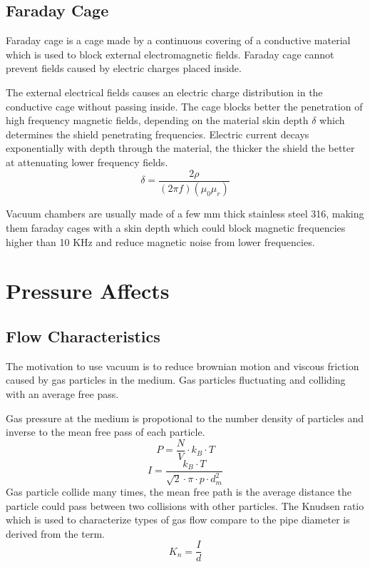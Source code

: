 \documentclass[\main/master.tex]{subfiles}
\begin{document}
\subsection{Faraday Cage}
Faraday cage is a cage made by a continuous covering of a conductive material which is used to block external electromagnetic fields. Faraday cage cannot prevent fields caused by electric charges placed inside.
\par
The external electrical fields causes an electric charge distribution in the conductive cage without passing inside. The cage blocks better the penetration of high frequency magnetic fields, depending on the material skin depth $\delta$ which determines the shield penetrating frequencies. Electric current decays exponentially with depth through the material, the thicker the shield the better at attenuating lower frequency fields.
\begin{equation}
\delta = \frac{2\rho}{(2\pi f)(\mu_0\mu_r)}     \label{eqn:mean-free-pass}
\end{equation}
\iffalse
Where $\rho$ is the material electric resistivity, and $\mu_r$ is the relative magnetic permeability.
\fi
Vacuum chambers are usually made of a few mm thick stainless steel 316, making them faraday cages with a skin depth which could block magnetic frequencies higher than 10 KHz and reduce magnetic noise from lower frequencies.


\section{Pressure Affects}
\subsection{Flow Characteristics}
The motivation to use vacuum is to reduce brownian motion and viscous friction caused by gas particles in the medium. Gas particles fluctuating and colliding with an average free pass. 
\par
Gas pressure at the medium is propotional to the number density of particles and inverse to the mean free pass of each particle.    
\begin{equation}
P = \frac{N}{V}\cdot k_B\cdot T  \label{eqn:ideal-gasses}
\end{equation}
\begin{equation}
I = \frac{k_B\cdot T}{\sqrt{2}\cdot\pi\cdot p\cdot d_m^2}     \label{eqn:mean-free-pass}
\end{equation}
Gas particle collide many times, the mean free path is the average distance the particle could pass between two collisions with other particles. The Knudsen ratio which is used to characterize types of gas flow compare to the pipe diameter is derived from the term.
\begin{equation}
K_n = \frac{I}{d}     \label{eqn:mean-free-pass}
\end{equation}
\end{document}
